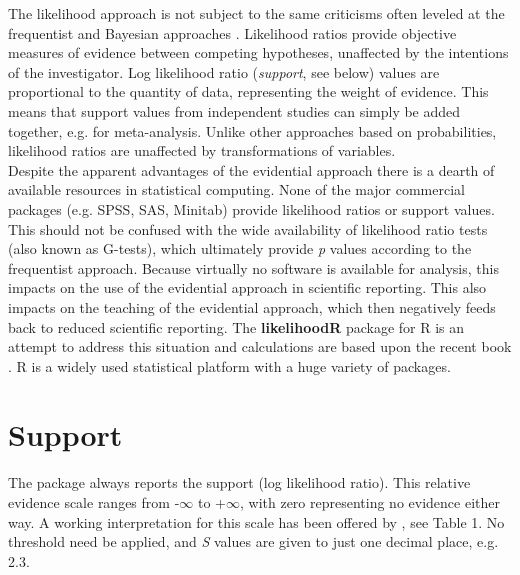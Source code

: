 The likelihood approach is not subject to the same criticisms often leveled at the frequentist and Bayesian approaches \citep{GoodmanRoyall:1988,Edwards:1992,Royall:1997,Goodman:1999,Dixon:2003,Dienes:2008,WassersteinLazar:2016,Lakens:2021}. Likelihood ratios provide objective measures of evidence between competing hypotheses, unaffected by the intentions of the investigator. Log likelihood ratio (\emph{support}, see below) values are proportional to the quantity of data, representing the weight of evidence. This means that support values from independent studies can simply be added together, e.g. for meta-analysis. Unlike other approaches based on probabilities, likelihood ratios are unaffected by transformations of variables.\\

Despite the apparent advantages of the evidential approach there is a dearth of available resources in statistical computing. None of the major commercial packages (e.g. SPSS, SAS, Minitab) provide likelihood ratios or support values. This should not be confused with the wide availability of likelihood ratio tests (also known as G-tests), which ultimately provide \emph{p} values according to the frequentist approach. 
Because virtually no software is available for analysis, this impacts on the use of the evidential approach in scientific reporting. This also impacts on the teaching of the evidential approach, which then negatively feeds back to reduced scientific reporting. The \textbf{likelihoodR} package for R \citep{likelihoodR} is an attempt to address this situation and calculations are based upon the recent book \citep{Cahusac:2020}. R \citep{ihaka:1996} is a widely used statistical platform with a huge variety of packages.\\

\section{Support}
The package always reports the support (log likelihood ratio). This relative evidence scale ranges from -$\infty$ to +$\infty$, with zero representing no evidence either way. A working interpretation for this scale has been offered by \citep{GoodmanRoyall:1988}, see Table 1. No threshold need be applied, and \emph{S} values are given to just one decimal place, e.g. 2.3.\\

